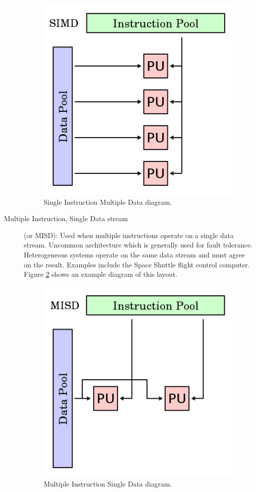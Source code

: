 \documentclass[a4paper,12pt,english]{report}
\begin{document}
\begin{description}
\begin{figure}[!ht]
\begin{center}
\includegraphics [bb= 0 0 200 200]{images/SIMD.png}
\end{center}
\caption{Single Instruction Multiple Data diagram.}
\label{simd}
\end{figure}

\item [Multiple Instruction, Single Data stream] (or MISD): Used when multiple instructions operate on a single data stream. Uncommon architecture which is generally used for fault tolerance. Heterogeneous systems operate on the same data stream and must agree on the result. Examples include the Space Shuttle flight control computer. Figure \ref{misd} shows an example diagram of this layout.

\begin{figure}[!ht]
\begin{center}
\includegraphics [bb= 0 0 200 200]{images/MISD.png}
\end{center}
\caption{Multiple Instruction Single Data diagram.}
\label{misd}
\end{figure}


\end{description}
\end{document}
